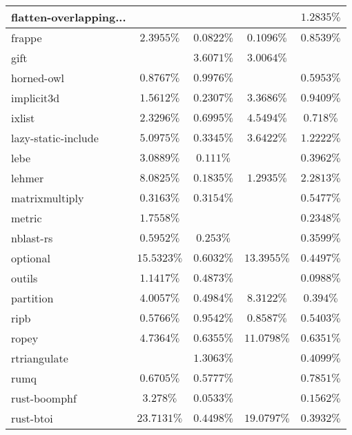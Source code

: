 \documentclass{article}
\begin{document}
\begin{longtable}[h!]{|l|c|c|c|c|}
    \hline
    flatten-overlapping... &  &  &  & $1.2835\%$ \\ %
    \hline
    frappe & $2.3955\%$ & $0.0822\%$ & $0.1096\%$ & $0.8539\%$ \\ %
     \hline
    gift &  & $3.6071\%$ & $3.0064\%$ &  \\ %
    \hline
    horned-owl & $0.8767\%$ & $0.9976\%$ &  & $0.5953\%$ \\ %
    \hline
    implicit3d & $1.5612\%$ & $0.2307\%$ & $3.3686\%$ & $0.9409\%$ \\ %
    \hline
    ixlist & $2.3296\%$ & $0.6995\%$ & $4.5494\%$ & $0.718\%$ \\ %
    \hline
    lazy-static-include & $5.0975\%$ & $0.3345\%$ & $3.6422\%$ & $1.2222\%$ \\ %
    \hline
    lebe & $3.0889\%$ & $0.111\%$ &  & $0.3962\%$ \\ %
     \hline
    lehmer & $8.0825\%$ & $0.1835\%$ & $1.2935\%$ & $2.2813\%$ \\ %
    \hline
    matrixmultiply & $0.3163\%$ & $0.3154\%$ &  & $0.5477\%$ \\ %
    \hline
    metric & $1.7558\%$ &  &  & $0.2348\%$ \\ %
    \hline
    nblast-rs & $0.5952\%$ & $0.253\%$ &  & $0.3599\%$ \\ %
    \hline
    optional & $15.5323\%$ & $0.6032\%$ & $13.3955\%$ & $0.4497\%$ \\ %
    \hline
    outils & $1.1417\%$ & $0.4873\%$ &  & $0.0988\%$ \\ %
     \hline
    partition & $4.0057\%$ & $0.4984\%$ & $8.3122\%$ & $0.394\%$ \\ %
    \hline
    ripb & $0.5766\%$ & $0.9542\%$ & $0.8587\%$ & $0.5403\%$ \\ %
    \hline
    ropey & $4.7364\%$ & $0.6355\%$ & $11.0798\%$ & $0.6351\%$ \\ %
    \hline
    rtriangulate &  & $1.3063\%$ &  & $0.4099\%$ \\ %
    \hline
    rumq & $0.6705\%$ & $0.5777\%$ &  & $0.7851\%$ \\ %
    \hline
    rust-boomphf & $3.278\%$ & $0.0533\%$ &  & $0.1562\%$ \\ %
     \hline
    rust-btoi & $23.7131\%$ & $0.4498\%$ & $19.0797\%$ & $0.3932\%$ \\ %

\end{longtable}
\end{document}
